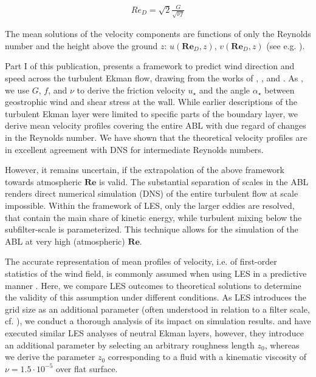 \documentclass[a4paper,11pt]{article}
\newcommand{\RE}{\mathbf{Re}}
\begin{document}
\begin{align}\label{red}
 Re_D = \sqrt{2}\frac{G}{\sqrt{\nu f}}
\end{align}

The mean solutions of the velocity components are functions of only the Reynolds number and the height above the ground $z$: $u(\RE_D,z)$, $v(\RE_D,z)$ (see e.g. \cite{csanady1967resistance}).

Part I of this publication, presents a framework to predict wind direction and speed across the turbulent Ekman flow, drawing from the works of \cite{csanady1967resistance}, \cite{tennekes1973logarithmic}, and \cite{spalart1989theoretical}. As \cite{spalart1989theoretical}, we use $G$, $f$, and $\nu$ to derive the friction velocity $u_\star$ and the angle $\alpha_\star$ between geostrophic wind and shear stress at the wall. While earlier descriptions of the turbulent Ekman layer were limited to specific parts of the boundary layer, we derive mean velocity profiles covering the entire ABL with due regard of changes in the Reynolds number. We have shown that the theoretical velocity profiles are in excellent agreement with DNS for intermediate Reynolds numbers. 

However, it remains uncertain, if the extrapolation of the above framework towards atmospheric $\RE$ is valid. The substantial separation of scales in the ABL renders direct numerical simulation (DNS) of the entire turbulent flow at scale impossible. Within the framework of LES, only the larger eddies are resolved, that contain the main share of kinetic energy, while turbulent mixing below the subfilter-scale is parameterized. This technique allows for the simulation of the ABL at very high (atmospheric) $\RE$. 

The accurate representation of mean profiles of velocity, i.e. of first-order statistics of the wind field, is commonly assumed when using LES in a predictive manner  \citep{fedorovich2004convective}. Here, we compare LES outcomes to theoretical solutions to determine the validity of this assumption under different conditions. As LES introduces the grid size as an additional parameter (often understood in relation to a filter scale, cf. \cite{pope2004ten}), we conduct a thorough analysis of its impact on simulation results. \cite{esau2004simulation} and \cite{jiang2018large} have executed similar LES analyses of neutral Ekman layers, however, they introduce an additional parameter by selecting an arbitrary roughness length $z_0$, whereas we derive the parameter $z_0$ corresponding to a fluid with a kinematic viscosity of $\nu = 1.5\cdot10^{-5}$ over flat surface.
\end{document}
